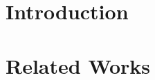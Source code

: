 \documentclass[10pt,twocolumn,letterpaper]{article}
\begin{document}
\begin{abstract}

\end{abstract}

\section{Introduction}
\label{sec:intro}


\section{Related Works}
\end{document}
